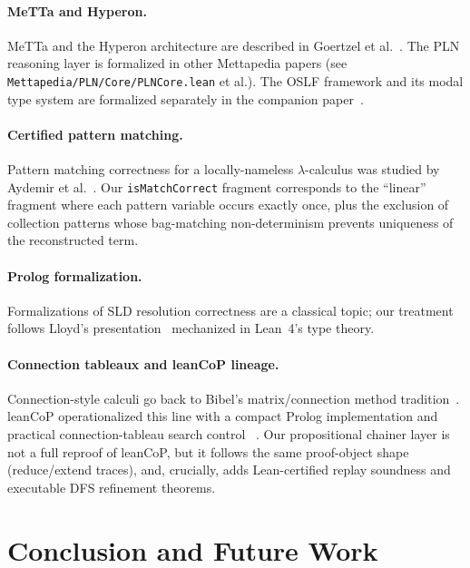 \documentclass[]{article}
\newcommand{\code}[1]{\texttt{#1}}
\newcommand{\MeTTa}{\textup{MeTTa}}
\newcommand{\OSLF}{\textup{OSLF}}
\begin{document}
\paragraph{\MeTTa{} and Hyperon.}
MeTTa and the Hyperon architecture are described in Goertzel et al.~\cite{goertzel2009pln}.
The PLN reasoning layer is formalized in other Mettapedia papers
(see \code{Mettapedia/PLN/Core/PLNCore.lean} et al.).
The \OSLF{} framework and its modal type system are formalized separately
in the companion paper~\cite{leanOSLF2025}.

\paragraph{Certified pattern matching.}
Pattern matching correctness for a locally-nameless $\lambda$-calculus was studied
by Aydemir et al.~\cite{AydemarPOPL2008}.  Our \code{isMatchCorrect} fragment
corresponds to the ``linear'' fragment where each pattern variable occurs exactly
once, plus the exclusion of collection patterns whose bag-matching non-determinism
prevents uniqueness of the reconstructed term.

\paragraph{Prolog formalization.}
Formalizations of SLD resolution correctness are a classical topic; our treatment
follows Lloyd's presentation~\cite{Lloyd1987} mechanized in Lean~4's type theory.

\paragraph{Connection tableaux and leanCoP lineage.}
Connection-style calculi go back to Bibel's matrix/connection method
tradition~\cite{Bibel1987}.  leanCoP operationalized this line with a compact
Prolog implementation and practical connection-tableau search control
~\cite{Otten2010leanCoP}.  Our propositional chainer layer is not a full reproof
of leanCoP, but it follows the same proof-object shape (reduce/extend traces),
and, crucially, adds Lean-certified replay soundness and executable DFS
refinement theorems.

\section{Conclusion and Future Work}
\label{sec:conclusion}
\end{document}

